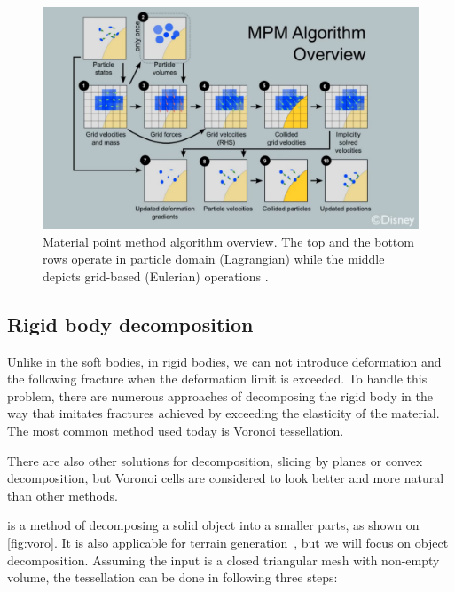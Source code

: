 \begin{figure}
\centering
\includegraphics[width=\textwidth]{img/MPM}
\caption{Material point method algorithm overview. The top and the bottom rows operate in particle domain (Lagrangian) while the middle depicts grid-based (Eulerian) operations \cite{disney}.
}
\label{fig:mpm}
\end{figure}

\subsection{Rigid body decomposition}
Unlike in the soft bodies, in rigid bodies, we can not introduce deformation and the following fracture when the deformation limit is exceeded. To handle this problem, there are numerous approaches of decomposing the rigid body in the way that imitates fractures achieved by exceeding the elasticity of the material. The most common method used today is Voronoi tessellation. 

There are also other solutions for decomposition, \eg slicing by planes or convex decomposition, but Voronoi cells are considered to look better and more natural than other methods.

 is a method of decomposing a solid object into a smaller parts, as shown on \cref{fig:voro}. It is also applicable for \eg terrain generation~\cite{voronoiterrainrealtime}, but we will focus on object decomposition. Assuming the input is a closed triangular mesh with non-empty volume, the tessellation can be done in following three steps:

